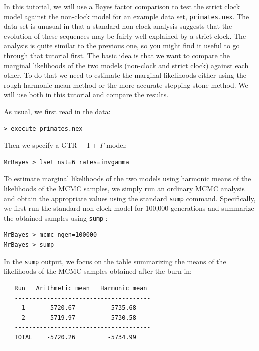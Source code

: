 \documentclass[12pt]{book}
\newcommand{\ttt}[1]{\texttt{#1} }
\begin{document}
In this tutorial, we will use a Bayes factor comparison to test the strict clock model against the non-clock model for an example data set, \texttt{primates.nex}. The data set is unusual in that a standard non-clock analysis suggests that
the evolution of these sequences may be fairly well explained by a strict clock. The analysis is quite similar to the
previous one, so you might find it useful to go through that tutorial first. The basic idea
is that we want to compare the marginal likelihoods of the two models (non-clock and strict clock) against each
other. To do that we need to estimate the marginal likelihoods either using the rough harmonic mean method or
the more accurate stepping-stone method. We will use both in this tutorial and compare the results.

As usual, we first read in the data:

\begin{verbatim}
> execute primates.nex
\end{verbatim}

Then we specify a GTR + I + $\Gamma$ model:

\begin{verbatim}
MrBayes > lset nst=6 rates=invgamma
\end{verbatim}

To estimate marginal likelihoods of the two models using harmonic means of the likelihoods of the MCMC samples,
we simply run an ordinary MCMC analysis and obtain the appropriate values using the standard \texttt{sump}
command. Specifically, we first run the standard non-clock model for 100,000 generations and summarize the
obtained samples using \ttt{sump}:

\begin{singlespacing}
\begin{verbatim}
MrBayes > mcmc ngen=100000
MrBayes > sump
\end{verbatim}
\end{singlespacing}

In the \texttt{sump} output, we focus on the table summarizing the means of the likelihoods of the MCMC samples
obtained after the burn-in:

\begin{singlespacing}
\begin{verbatim}
   Run   Arithmetic mean   Harmonic mean
   --------------------------------------
     1      -5720.67         -5735.68
     2      -5719.97         -5730.58
   --------------------------------------
   TOTAL    -5720.26         -5734.99
   --------------------------------------
\end{verbatim}
\end{singlespacing}
\end{document}
